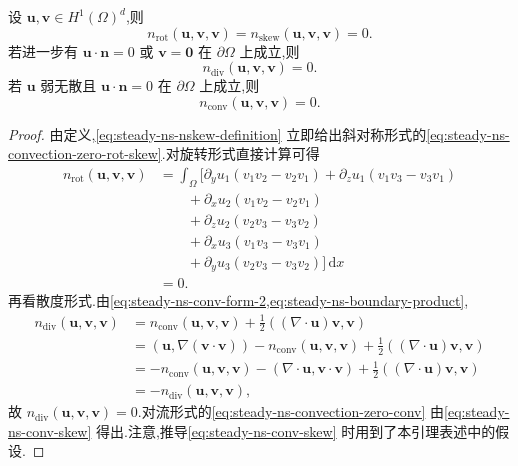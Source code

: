 \begin{lemma}[对流项的消失]\label{lem:steady-ns-convection-vanishing}
设 $\bm{u},\bm{v}\in H^1(\Omega)^d$,则
\begin{equation}\label{eq:steady-ns-convection-zero-rot-skew}
  n_{\mathrm{rot}}(\bm{u},\bm{v},\bm{v})
   =n_{\mathrm{skew}}(\bm{u},\bm{v},\bm{v})=0.
\end{equation}
若进一步有 $\bm{u}\cdot\bm{n}=0$ 或 $\bm{v}=\bm{0}$ 在 $\partial\Omega$ 上成立,则
\begin{equation}\label{eq:steady-ns-convection-zero-div}
  n_{\mathrm{div}}(\bm{u},\bm{v},\bm{v})=0.
\end{equation}
若 $\bm{u}$ 弱无散且 $\bm{u}\cdot\bm{n}=0$ 在 $\partial\Omega$ 上成立,则
\begin{equation}\label{eq:steady-ns-convection-zero-conv}
  n_{\mathrm{conv}}(\bm{u},\bm{v},\bm{v})=0.
\end{equation}
\end{lemma}

\begin{proof}
由定义,\cref{eq:steady-ns-nskew-definition} 立即给出斜对称形式的\cref{eq:steady-ns-convection-zero-rot-skew}.对旋转形式直接计算可得
\[
\begin{aligned}
  n_{\mathrm{rot}}(\bm{u},\bm{v},\bm{v})
   &=\int_\Omega\bigl[
      \partial_yu_1(v_1v_2-v_2v_1)
      +\partial_zu_1(v_1v_3-v_3v_1)\\
   &\qquad+\partial_xu_2(v_1v_2-v_2v_1)\\
   &\qquad+\partial_zu_2(v_2v_3-v_3v_2)\\
   &\qquad+\partial_xu_3(v_1v_3-v_3v_1)\\
   &\qquad+\partial_yu_3(v_2v_3-v_3v_2)\bigr]\,\mathrm{d}x\\
   &=0.
\end{aligned}
\]
再看散度形式.由\cref{eq:steady-ns-conv-form-2,eq:steady-ns-boundary-product},
\[
\begin{aligned}
  n_{\mathrm{div}}(\bm{u},\bm{v},\bm{v})
   &=n_{\mathrm{conv}}(\bm{u},\bm{v},\bm{v})
      +\frac12((\nabla\cdot\bm{u})\bm{v},\bm{v})\\
   &=(\bm{u},\nabla(\bm{v}\cdot\bm{v}))
      -n_{\mathrm{conv}}(\bm{u},\bm{v},\bm{v})
      +\frac12((\nabla\cdot\bm{u})\bm{v},\bm{v})\\
   &=-n_{\mathrm{conv}}(\bm{u},\bm{v},\bm{v})
      -(\nabla\cdot\bm{u},\bm{v}\cdot\bm{v})
      +\frac12((\nabla\cdot\bm{u})\bm{v},\bm{v})\\
   &=-n_{\mathrm{div}}(\bm{u},\bm{v},\bm{v}),
\end{aligned}
\]
故 $n_{\mathrm{div}}(\bm{u},\bm{v},\bm{v})=0$.对流形式的\cref{eq:steady-ns-convection-zero-conv} 由\cref{eq:steady-ns-conv-skew} 得出.注意,推导\cref{eq:steady-ns-conv-skew} 时用到了本引理表述中的假设.
\end{proof}

